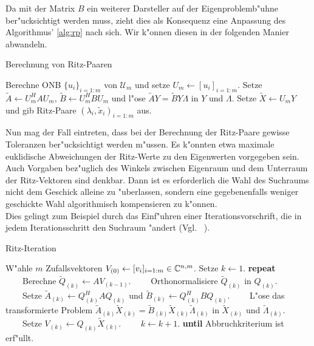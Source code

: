 Da mit der Matrix $B$ ein weiterer Darsteller auf der Eigenproblemb"uhne ber"ucksichtigt werden muss, zieht dies als Konsequenz eine Anpassung des Algorithmus' \ref{alg:rp} nach sich. Wir k"onnen diesen in der folgenden Manier abwandeln.

\begin{algorithm}\label{alg:grp}
\caption{Berechnung von Ritz-Paaren}
\begin{algorithmic}[1]
\State Berechne ONB $\{u_i\}_{i=1:m}$ von $\mathcal{U}_m$ und setze $U_m\gets[u_i]_{i=1:m}$.
\State Setze $\widetilde{A}\gets U_m^H A U_m$,
$\widetilde{B} \gets U_m^H BU_m$ und
l"ose $\widetilde{A}Y = \widetilde{B}Y \Lambda$ in $Y$ und $\Lambda$.
\State Setze $\widetilde{X} \gets U_m Y$ und gib Ritz-Paare $(\lambda_i, \widetilde{x}_i)_{i=1:m}$ aus.
\end{algorithmic}
\end{algorithm}

Nun mag der Fall eintreten, dass bei der Berechnung der Ritz-Paare gewisse Toleranzen ber"ucksichtigt werden m"ussen.
Es k"onnten etwa maximale euklidische Abweichungen der Ritz-Werte zu den Eigenwerten vorgegeben sein.
Auch Vorgaben bez"uglich des Winkels zwischen Eigenraum und dem Unterraum der Ritz-Vektoren sind denkbar. Dann ist es erforderlich die Wahl des Suchraums nicht dem Geschick alleine zu "uberlassen, sondern eine gegebenenfalls weniger geschickte Wahl algorithmisch kompensieren zu k"onnen.\\

Dies gelingt zum Beispiel durch das Einf"uhren einer Iterationsvorschrift, die in jedem Iterationsschritt den Suchraum "andert (Vgl. ~\cite[118f]{saad}).

\begin{algorithm}\label{alg:ritzerativ}
\caption{Ritz-Iteration}
\begin{algorithmic}[1]
\State W"ahle $m$ Zufallsvektoren $V_{(0)}\gets[v_i]_{i=1:m} \in \mathbb{C}^{n,m}$. Setze $k\gets 1$.
\State \textbf{repeat}
\State \ \ \ \ Berechne $\widetilde{Q}_{(k)} \gets AV_{(k-1)}$.
\State \ \ \ \ Orthonormalisiere $\widetilde{Q}_{(k)}$ in $Q_{(k)}$.
\State \ \ \ \ Setze $\widetilde{A}_{(k)}\gets Q_{(k)}^H A Q_{(k)}$ und $\widetilde{B}_{(k)}\gets Q_{(k)}^H B Q_{(k)}$.
\State \ \ \ \ L"ose das transformierte Problem $\widetilde{A}_{(k)}\widetilde{X}_{(k)}
= \widetilde{B}_{(k)}\widetilde{X}_{(k)}\widetilde{\Lambda}_{(k)}$ in
$\widetilde{X}_{(k)}$ und $\widetilde{\Lambda}_{(k)}$.
\State \ \ \ \ Setze $V_{(k)} \gets Q_{(k)}\widetilde{X}_{(k)}$.
\State \ \ \ \ $k \gets k+1$.
\State \textbf{until} Abbruchkriterium ist erf"ullt.
\end{algorithmic}
\end{algorithm}

